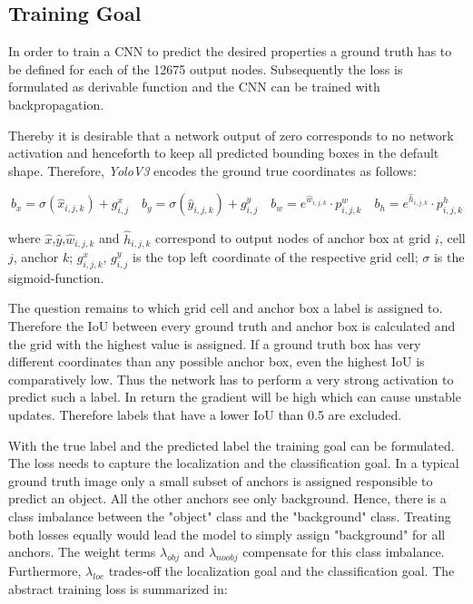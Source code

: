 	\subsection{Training Goal}
	
	In order to train a \ac{CNN} to predict the desired properties a ground truth has to be defined for each of the 12675 output nodes. Subsequently the loss is formulated as derivable function and the \ac{CNN} can be trained with backpropagation.
	
	Thereby it is desirable that a network output of zero corresponds to no network activation and henceforth to keep all predicted bounding boxes in the default shape. Therefore, \textit{YoloV3} encodes the ground true coordinates as follows:
	 
	
	\begin{equation}
	\label{sec:encoding}
	b_x = \sigma(\hat x_{i,j,k}) + g^x_{i,j}\quad
	b_y = \sigma(\hat y_{i,j,k}) + g^y_{i,j}\quad
	b_w = e^{\hat w_{i,j,k}} \cdot p^w_{i,j,k}\quad
	b_h = e^{\hat h_{i,j,k}} \cdot p^h_{i,j,k}
	\end{equation}
	
	where $\hat{x}$,$\hat{y}$,$\hat w_{i,j,k}$ and $\hat h_{i,j,k}$ correspond to output nodes of anchor box at grid $i$, cell $j$, anchor $k$; $g^x_{i,j,k}$, $g^y_{i,j}$ is the top left coordinate of the respective grid cell; $\sigma$ is the sigmoid-function.
	
	The question remains to which grid cell and anchor box a label is assigned to. Therefore the \ac{IoU} between every ground truth and anchor box is calculated and the grid with the highest value is assigned. If a ground truth box has very different coordinates than any possible anchor box, even the highest \ac{IoU} is comparatively low. Thus the network has to perform a very strong activation to predict such a label. In return the gradient will be high which can cause unstable updates. Therefore labels that have a lower \ac{IoU} than 0.5 are excluded. 
	
	With the true label and the predicted label the training goal can be formulated. The loss needs to capture the localization and the classification goal. In a typical ground truth image only a small subset of anchors is assigned responsible to predict an object. All the other anchors see only background. Hence, there is a class imbalance between the "object" class and the "background" class. Treating both losses equally would lead the model to simply assign "background" for all anchors. The weight terms $\lambda_{obj}$ and $\lambda_{noobj}$ compensate for this class imbalance. Furthermore, $\lambda_{loc}$ trades-off the localization goal and the classification goal. The abstract training loss is summarized in: 

